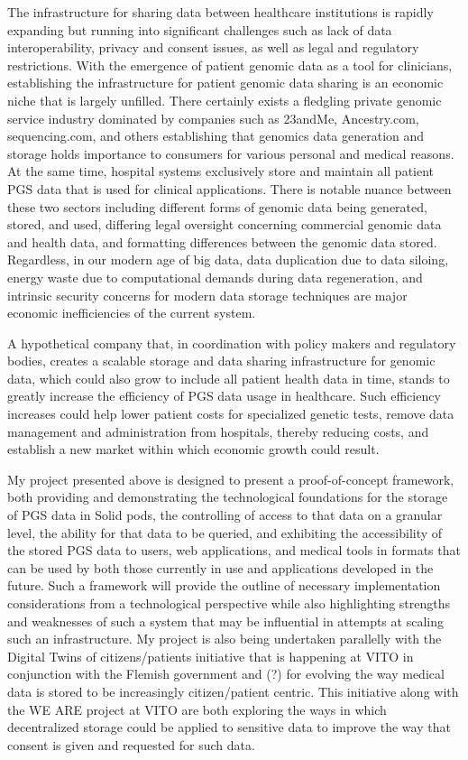 \documentclass[a4paper,11pt]{article}
\begin{document}
The infrastructure for sharing data between healthcare institutions is rapidly expanding but running into significant challenges such as lack of data interoperability, privacy and consent issues, as well as legal and regulatory restrictions. 
With the emergence of patient genomic data as a tool for clinicians, establishing the infrastructure for patient genomic data sharing is an economic niche that is largely unfilled. 
There certainly exists a fledgling private genomic service industry dominated by companies such as 23andMe, Ancestry.com, sequencing.com, and others establishing that genomics data generation and storage holds importance to consumers for various personal and medical reasons. 
At the same time, hospital systems exclusively store and maintain all patient PGS data that is used for clinical applications. 
There is notable nuance between these two sectors including different forms of genomic data being generated, stored, and used, differing legal oversight concerning commercial genomic data and health data, and formatting differences between the genomic data stored. 
Regardless, in our modern age of big data, data duplication due to data siloing, energy waste due to computational demands during data regeneration, and intrinsic security concerns for modern data storage techniques are major economic inefficiencies of the current system. 

A hypothetical company that, in coordination with policy makers and regulatory bodies, creates a scalable storage and data sharing infrastructure for genomic data, which could also grow to include all patient health data in time, stands to greatly increase the efficiency of PGS data usage in healthcare. 
Such efficiency increases could help lower patient costs for specialized genetic tests, remove data management and administration from hospitals, thereby reducing costs, and establish a new market within which economic growth could result. 

My project presented above is designed to present a proof-of-concept framework, both providing and demonstrating the technological foundations for the storage of PGS data in Solid pods, the controlling of access to that data on a granular level, the ability for that data to be queried, and exhibiting the accessibility of the stored PGS data to users, web applications, and medical tools in formats that can be used by both those currently in use and applications developed in the future. 
Such a framework will provide the outline of necessary implementation considerations from a technological perspective while also highlighting strengths and weaknesses of such a system that may be influential in attempts at scaling such an infrastructure. My project is also being undertaken parallelly with the Digital Twins of citizens/patients initiative that is happening at VITO in conjunction with the Flemish government and (?) for evolving the way medical data is stored to be increasingly citizen/patient centric. 
This initiative along with the WE ARE project at VITO are both exploring the ways in which decentralized storage could be applied to sensitive data to improve the way that consent is given and requested for such data. 
\end{document}
